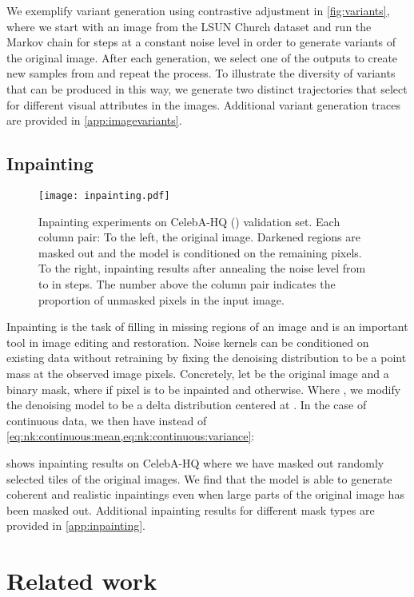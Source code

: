 \documentclass[10pt,twocolumn,letterpaper]{article}
\begin{document}
We exemplify variant generation using contrastive adjustment in \cref{fig:variants}, where we start with an image from the LSUN Church dataset and run the Markov chain for  steps at a constant noise level  in order to generate variants of the original image.
After each generation, we select one of the outputs to create new samples from and repeat the process.
To illustrate the diversity of variants that can be produced in this way, we generate two distinct trajectories that select for different visual attributes in the images.
Additional variant generation traces are provided in \cref{app:imagevariants}.


\subsection{Inpainting}

\begin{figure}[t]
  \centering
  \texttt{[image: inpainting.pdf]}\caption{Inpainting experiments on CelebA-HQ () validation set.
    Each column pair:
    To the left, the original image.
    Darkened regions are masked out and the model is conditioned on the remaining pixels.
    To the right, inpainting results after annealing the noise level from  to  in  steps.
    The number above the column pair indicates the proportion of unmasked pixels in the input image.
  }\label{fig:inpainting}
\end{figure}

Inpainting is the task of filling in missing regions of an image and is an important tool in image editing and restoration.
Noise kernels can be conditioned on existing data without retraining by fixing the denoising distribution  to be a point mass at the observed image pixels.
Concretely, let  be the original image and  a binary mask, where  if pixel  is to be inpainted and  otherwise.
Where , we modify the denoising model  to be a delta distribution centered at .
In the case of continuous data, we then have instead of \cref{eq:nk:continuous:mean,eq:nk:continuous:variance}:


 shows inpainting results on CelebA-HQ where we have masked out randomly selected  tiles of the original images.
We find that the model is able to generate coherent and realistic inpaintings even when large parts of the original image has been masked out.
Additional inpainting results for different mask types are provided in \cref{app:inpainting}.


\section{Related work}
\end{document}
